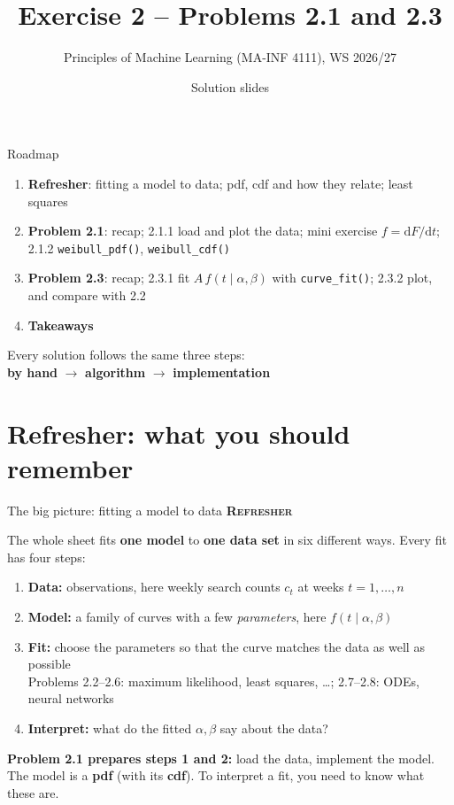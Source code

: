 \documentclass[aspectratio=169,11pt]{beamer}
\title{Exercise 2 -- Problems 2.1 and 2.3}
\subtitle{Principles of Machine Learning (MA-INF 4111), WS 2026/27}
\date{Solution slides}
\newcommand{\stage}[2]{{\color{#1}\bfseries\small\textsc{#2}}\par\smallskip}
\newcommand{\Refresh}{\stage{given}{Refresher}}
\begin{document}
\maketitle

\begin{frame}{Roadmap}
\begin{enumerate}
\item \textbf{Refresher}: fitting a model to data; pdf, cdf and how they relate; least squares
\item \textbf{Problem 2.1}: recap; 2.1.1 load and plot the data; mini exercise $f=\mathrm dF/\mathrm dt$; 2.1.2 \texttt{weibull\_pdf()}, \texttt{weibull\_cdf()}
\item \textbf{Problem 2.3}: recap; 2.3.1 fit $A\,f(t\mid\alpha,\beta)$ with \texttt{curve\_fit()}; 2.3.2 plot, and compare with 2.2
\item \textbf{Takeaways}
\end{enumerate}
\bigskip
Every solution follows the same three steps:\\[3pt]
\textcolor{hand}{\textbf{by hand}} \;$\to$\; \textcolor{algo}{\textbf{algorithm}} \;$\to$\; \textcolor{impl}{\textbf{implementation}}
\end{frame}

\section{Refresher: what you should remember}

\begin{frame}{The big picture: fitting a model to data}\small
\Refresh
The whole sheet fits \textbf{one model} to \textbf{one data set} in six different ways. Every fit has four steps:
\begin{enumerate}
\item \textbf{Data:} observations, here weekly search counts $c_t$ at weeks $t=1,\dots,n$
\item \textbf{Model:} a family of curves with a few \emph{parameters}, here $f(t\mid\alpha,\beta)$
\item \textbf{Fit:} choose the parameters so that the curve matches the data as well as possible\\
\quad Problems 2.2--2.6: maximum likelihood, least squares, \dots; 2.7--2.8: ODEs, neural networks
\item \textbf{Interpret:} what do the fitted $\alpha,\beta$ say about the data?
\end{enumerate}
\medskip
\textbf{Problem 2.1 prepares steps 1 and 2:} load the data, implement the model.\\
The model is a \textbf{pdf} (with its \textbf{cdf}). To interpret a fit, you need to know what these are.
\end{frame}
\end{document}
